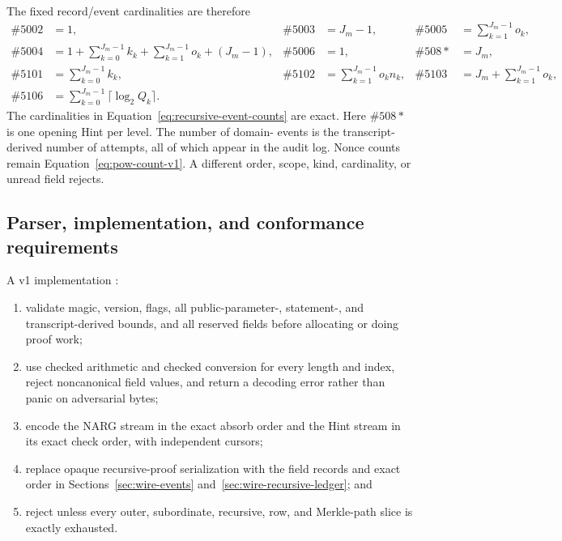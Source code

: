 The fixed record/event cardinalities are therefore
\begin{equation}
 \begin{aligned}
  \#5002&=1,& \#5003&=J_m-1,& \#5005&=\sum_{k=1}^{J_m-1}o_k,\\
  \#5004&=1+\sum_{k=0}^{J_m-1}k_k
     +\sum_{k=1}^{J_m-1}o_k+(J_m-1),&
  \#5006&=1,& \#508{*}&=J_m,\\
  \#5101&=\sum_{k=0}^{J_m-1}k_k,&
  \#5102&=\sum_{k=1}^{J_m-1}o_kn_k,&
  \#5103&=J_m+\sum_{k=1}^{J_m-1}o_k,\\
  \#5106&=\sum_{k=0}^{J_m-1}\lceil\log_2Q_k\rceil.
 \end{aligned}
 \label{eq:recursive-event-counts}
\end{equation}
The cardinalities in Equation~\eqref{eq:recursive-event-counts} are exact.
Here $\#508{*}$ is one opening Hint per level.  The number of domain-
 events is the
transcript-derived number of attempts, all of which appear in the audit log.
Nonce counts remain Equation~\eqref{eq:pow-count-v1}.  A different order,
scope, kind, cardinality, or unread field rejects.

\subsection{Parser, implementation, and conformance requirements}
\label{sec:wire-conformance}

A v1 implementation \must{}:
\begin{enumerate}
 \item validate magic, version, flags, all public-parameter-, statement-, and
 transcript-derived bounds, and all
reserved fields before allocating or doing proof work;
 \item use checked arithmetic and checked conversion for every length and
 index, reject noncanonical field values, and return a decoding error rather
 than panic on adversarial bytes;
 \item encode the NARG stream in the exact absorb order and the Hint stream in
 its exact check order, with independent cursors;
 \item replace opaque recursive-proof serialization with the field records and
 exact order in Sections~\ref{sec:wire-events}
 and~\ref{sec:wire-recursive-ledger}; and
 \item reject unless every outer, subordinate, recursive, row, and Merkle-path
 slice is exactly exhausted.
\end{enumerate}

